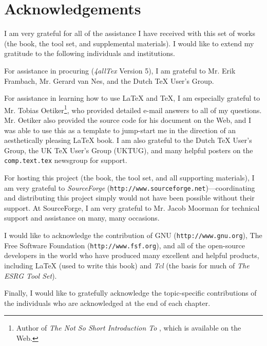 \chapter{Acknowledgements}

I am very grateful for all
of the assistance I have received with this set of works (the book,
the tool set, and supplemental materials).  I would
like to extend my gratitude to the following individuals
and institutions.

For assistance in procuring \LaTeXe{} (\emph{4allTex} Version 5), I am
grateful to Mr. Erik Frambach, Mr. Gerard van Nes, and the Dutch
\TeX{} User's Group.

For assistance in learning how to use \LaTeX{} and \TeX{}, I am
especially grateful to Mr. Tobias Oetiker\footnote{Author of
\emph{The Not So Short Introduction To \LaTeXe{}}, which is
available on the Web.},
who provided detailed e-mail answers to all of
my questions.  Mr. Oetiker also provided the source code for his
document on the Web, and I was able to use this as a template to
jump-start me in the direction of an aesthetically pleasing
\LaTeX{} book.  I am also grateful to the Dutch \TeX{}
User's Group, the UK \TeX{}
User's Group (UKTUG), and many helpful posters on the 
\texttt{comp.text.tex} newsgroup
\cite{bibref:n:comptexttex} for support.

For hosting this project (the book, the tool set, and all supporting
materials), I am very grateful to \emph{SourceForge}
(\texttt{http://www.sourceforge.net})---coordinating and 
distributing this project simply would not have been possible without
their support.  At SourceForge, I am very grateful to Mr.
Jacob Moorman for technical support and assistance on many,
many occasions.

I would like to acknowledge the contribution of GNU 
(\texttt{http://www.gnu.org}), 
The Free Software Foundation 
(\texttt{http://www.fsf.org}), and all of the open-source
developers in the world who have produced many excellent and
helpful products, including
\LaTeX{} (used to write this book) and 
\emph{Tcl} (the basis
for much of \emph{The ESRG Tool Set}).

Finally, I would like to gratefully acknowledge the
topic-specific contributions of the individuals who are
acknowledged at the end of each chapter.


